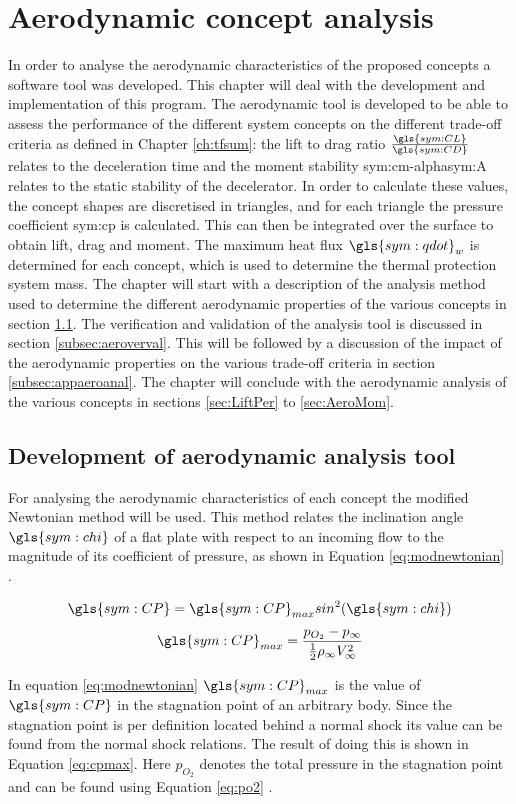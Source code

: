 \section{Aerodynamic concept analysis}
\label{ch:aero_analysis}
In order to analyse the aerodynamic characteristics of the proposed concepts a software tool was developed. This chapter will deal with the development and implementation of this program. The aerodynamic tool is developed to be able to assess the performance of the different system concepts on the different trade-off criteria as defined in Chapter \ref{ch:tfsum}: the lift to drag ratio $\frac{\gls{sym:CL}}{\gls{sym:CD}}$ relates to the deceleration time and the moment stability \gls{sym:cm-alpha}\gls{sym:A} relates to the static stability of the decelerator. In order to calculate these values, the concept shapes are discretised in triangles, and for each triangle the pressure coefficient \gls{sym:cp} is calculated. This can then be integrated over the surface to obtain lift, drag and moment. The maximum heat flux $\gls{sym:qdot}_w$ is determined for each concept, which is used to determine the thermal protection system mass. 
The chapter will start with a description of the analysis method used to determine the different aerodynamic properties of the various concepts in section \ref{subsec:aerotool}. The verification and validation of the analysis tool is discussed in section \ref{subsec:aeroverval}. This will be followed by a discussion of the impact of the aerodynamic properties on the various trade-off criteria in section \ref{subsec:appaeroanal}. The chapter will conclude with the aerodynamic analysis of the various concepts in sections \ref{sec:LiftPer} to \ref{sec:AeroMom}.

\subsection{Development of aerodynamic analysis tool}
\label{subsec:aerotool}
For analysing the aerodynamic characteristics of each concept the modified Newtonian method will be used. This method relates the inclination angle $\gls{sym:chi}$ of a flat plate with respect to an incoming flow to the magnitude of its coefficient of pressure, as shown in Equation \ref{eq:modnewtonian} \cite{AndersonJr.2006}.
\begin{multicols}{2}
\begin{equation}
\gls{sym:CP}=\gls{sym:CP}_{max}sin^{2}(\gls{sym:chi})
\label{eq:modnewtonian}
\end{equation} \break
\begin{equation}
\gls{sym:CP}_{max}=\frac{p_{O_{2}}-p_{\infty}}{\frac{1}{2}\rho_{\infty}V_{\infty}^{2}}
\label{eq:cpmax}
\end{equation}
\end{multicols}
In equation \ref{eq:modnewtonian} $\gls{sym:CP}_{max}$ is the value of $\gls{sym:CP}$ in the stagnation point of an arbitrary body. Since the stagnation point is per definition located behind a normal shock its value can be found from the normal shock relations. The result of doing this is shown in Equation \ref{eq:cpmax}. Here $p_{O_{2}}$ denotes the total pressure in the stagnation point and can be found using Equation \ref{eq:po2} \cite{AndersonJr.2007}.

